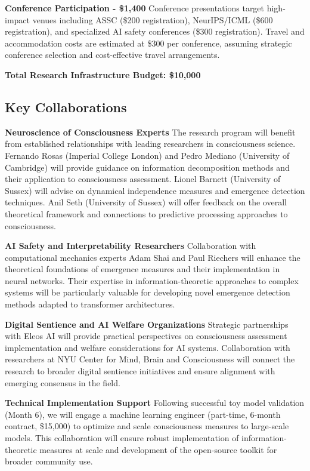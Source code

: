 \documentclass[11pt,a4paper]{article}
\begin{document}
    \textbf{Conference Participation - \$1,400}
    Conference presentations target high-impact venues including ASSC (\$200 registration), NeurIPS/ICML (\$600 registration), and specialized AI safety conferences (\$300 registration). Travel and accommodation costs are estimated at \$300 per conference, assuming strategic conference selection and cost-effective travel arrangements.
    
    \textbf{Total Research Infrastructure Budget: \$10,000}
    
    \subsection{Key Collaborations}
    
    \textbf{Neuroscience of Consciousness Experts}
    The research program will benefit from established relationships with leading researchers in consciousness science. Fernando Rosas (Imperial College London) and Pedro Mediano (University of Cambridge) will provide guidance on information decomposition methods and their application to consciousness assessment. Lionel Barnett (University of Sussex) will advise on dynamical independence measures and emergence detection techniques. Anil Seth (University of Sussex) will offer feedback on the overall theoretical framework and connections to predictive processing approaches to consciousness.
    
    \textbf{AI Safety and Interpretability Researchers}
    Collaboration with computational mechanics experts Adam Shai and Paul Riechers will enhance the theoretical foundations of emergence measures and their implementation in neural networks. Their expertise in information-theoretic approaches to complex systems will be particularly valuable for developing novel emergence detection methods adapted to transformer architectures.
    
    \textbf{Digital Sentience and AI Welfare Organizations}
    Strategic partnerships with Eleos AI will provide practical perspectives on consciousness assessment implementation and welfare considerations for AI systems. Collaboration with researchers at NYU Center for Mind, Brain and Consciousness will connect the research to broader digital sentience initiatives and ensure alignment with emerging consensus in the field.
    
    \textbf{Technical Implementation Support}
    Following successful toy model validation (Month 6), we will engage a machine learning engineer (part-time, 6-month contract, \$15,000) to optimize and scale consciousness measures to large-scale models. This collaboration will ensure robust implementation of information-theoretic measures at scale and development of the open-source toolkit for broader community use.
    
\end{document}
